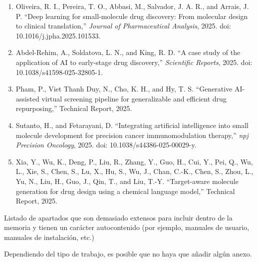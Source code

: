\documentclass[IB]{TFUOC}%
\begin{document}
\begin{enumerate}
\item Oliveira, R. I., Pereira, T. O., Abbasi, M., Salvador, J. A. R., and Arrais, J. P.  
``Deep learning for small-molecule drug discovery: From molecular design to clinical translation,''  
\textit{Journal of Pharmaceutical Analysis}, 2025.  
doi: 10.1016/j.jpha.2025.101533.

\item Abdel-Rehim, A., Soldatova, L. N., and King, R. D.  
``A case study of the application of AI to early-stage drug discovery,''  
\textit{Scientific Reports}, 2025.  
doi: 10.1038/s41598-025-32805-1.

\item Pham, P., Viet Thanh Duy, N., Cho, K. H., and Hy, T. S.  
``Generative AI-assisted virtual screening pipeline for generalizable and efficient drug repurposing,''  
Technical Report, 2025.

\item Sutanto, H., and Fetarayani, D.  
``Integrating artificial intelligence into small molecule development for precision cancer immunomodulation therapy,''  
\textit{npj Precision Oncology}, 2025.  
doi: 10.1038/s44386-025-00029-y.

\item Xia, Y., Wu, K., Deng, P., Liu, R., Zhang, Y., Guo, H., Cui, Y., Pei, Q., Wu, L., Xie, S., Chen, S., Lu, X., Hu, S., Wu, J., Chan, C.-K., Chen, S., Zhou, L., Yu, N., Liu, H., Guo, J., Qin, T., and Liu, T.-Y.  
``Target-aware molecule generation for drug design using a chemical language model,''  
Technical Report, 2025.

\end{enumerate}

\newpage
\appendix
Listado de apartados que son demasiado extensos para incluir dentro de la memoria y tienen un carácter autocontenido (por ejemplo, manuales de usuario, manuales de instalación, etc.)
 
Dependiendo del tipo de trabajo, es posible que no haya que añadir algún anexo.
\end{document}
